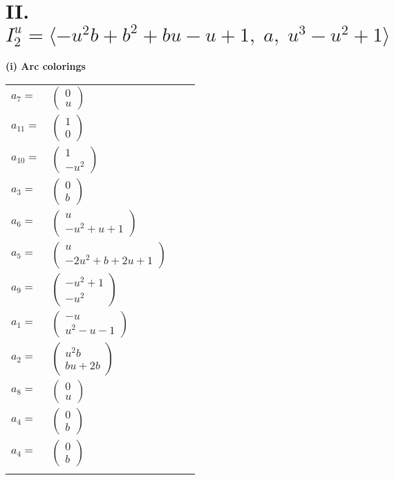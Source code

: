 \documentclass[1p]{elsarticle_modified}
\theoremstyle{definition}
\begin{document}
\centering \section*{II. $I^u_{2}= \langle - u^2 b+b^2+b u- u+1,\;a,\;u^3- u^2+1 \rangle$}
\flushleft \textbf{(i) Arc colorings}\\
\begin{tabular}{m{7pt} m{180pt} m{7pt} m{180pt} }
\flushright $a_{7}=$&$\begin{pmatrix}0\\u\end{pmatrix}$ \\
\flushright $a_{11}=$&$\begin{pmatrix}1\\0\end{pmatrix}$ \\
\flushright $a_{10}=$&$\begin{pmatrix}1\\- u^2\end{pmatrix}$ \\
\flushright $a_{3}=$&$\begin{pmatrix}0\\b\end{pmatrix}$ \\
\flushright $a_{6}=$&$\begin{pmatrix}u\\- u^2+u+1\end{pmatrix}$ \\
\flushright $a_{5}=$&$\begin{pmatrix}u\\-2 u^2+b+2 u+1\end{pmatrix}$ \\
\flushright $a_{9}=$&$\begin{pmatrix}- u^2+1\\- u^2\end{pmatrix}$ \\
\flushright $a_{1}=$&$\begin{pmatrix}- u\\u^2- u-1\end{pmatrix}$ \\
\flushright $a_{2}=$&$\begin{pmatrix}u^2 b\\b u+2 b\end{pmatrix}$ \\
\flushright $a_{8}=$&$\begin{pmatrix}0\\u\end{pmatrix}$ \\
\flushright $a_{4}=$&$\begin{pmatrix}0\\b\end{pmatrix}$\\ \flushright $a_{4}=$&$\begin{pmatrix}0\\b\end{pmatrix}$\\&\end{tabular}
\end{document}

